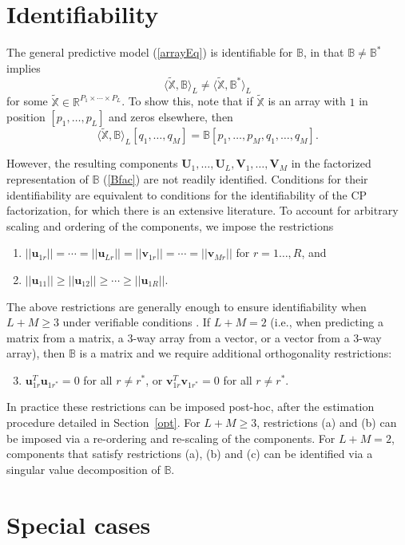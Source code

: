 \documentclass[12pt]{article}
\def\ctimes{\times \cdots \times}
\def\U{\mathbf{U}}
\def\u{\mathbf{u}}
\def\XX{\mathbb{X}}
\def\V{\mathbf{V}}
\def\BB{\mathbb{B}}
\def\v{\mathbf{v}}
\newcommand{\tprod}[3] {
  \langle #1, #2 \rangle_{#3}}
\begin{document}
\section{Identifiability}
\label{ident}  

The general predictive model (\ref{arrayEq}) is identifiable for $\BB$, in that $\BB \neq \BB^*$ implies 
\[\tprod{\tilde{\XX}}{\BB}{L} \neq \tprod{\tilde{\XX}}{\BB^*}{L} \]  
for some $\tilde{\XX} \in \mathbb{R}^{P_1 \ctimes P_L}$.  To show this, note that if $\tilde{\XX}$ is an array with $1$ in position $[p_1,\hdots,p_L]$ and zeros elsewhere, then 
\[\tprod{\tilde{\XX}}{\BB}{L}[q_1,\hdots,q_M] = \BB [p_1,\hdots,p_M,q_1,\hdots,q_M].\]

However, the resulting components $\U_1,\hdots,\U_L,\V_1,\hdots,\V_M$ in the factorized representation of $\BB$ (\ref{Bfac}) are not readily identified.  Conditions for their identifiability are equivalent to conditions for the identifiability of the CP factorization, for which there is an extensive literature.  To account for arbitrary scaling and ordering of the components, we impose the restrictions
\begin{enumerate}
\item $||\u_{1r}||=\cdots=||\u_{Lr}||=||\v_{1r}||=\cdots=||\v_{Mr}||$ for $r=1\hdots,R$, and 
\item $||\u_{11}|| \geq ||\u_{12}|| \geq \cdots \geq ||\u_{1R}||$.
\end{enumerate}
The above restrictions are generally enough to ensure identifiability when $L+M \geq 3$ under verifiable conditions \citep{sidiropoulos2000uniqueness}.  If $L+M = 2$ (i.e., when predicting a matrix from a matrix, a 3-way array from a vector, or a vector from a 3-way array), then $\BB$ is a matrix and we require additional orthogonality restrictions:
\begin{enumerate}
\setcounter{enumi}{2}
\item $\u_{1r}^T \u_{1r^*} = 0$ for all $r \neq r^*$, or $\v_{1r}^T \v_{1r^*} = 0$ for all $r \neq r^*$.
\end{enumerate}
In practice these restrictions can be imposed post-hoc, after the estimation procedure detailed in Section~\ref{opt}.  For $L+M \geq 3$, restrictions (a) and (b) can be imposed via a re-ordering and re-scaling of the components.  For $L+M=2$, components that satisfy restrictions (a), (b) and (c) can be identified via a singular value decomposition of $\BB$.  
   



\section{Special cases}
\label{relations}
\end{document}
